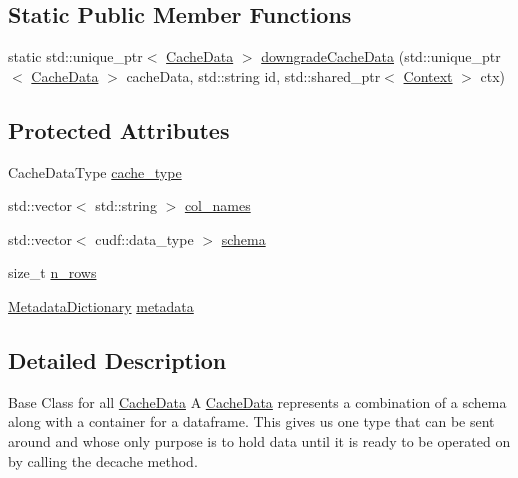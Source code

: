 \subsection*{Static Public Member Functions}
\begin{DoxyCompactItemize}
\item 
static std\+::unique\+\_\+ptr$<$ \hyperlink{classral_1_1cache_1_1CacheData}{Cache\+Data} $>$ \hyperlink{classral_1_1cache_1_1CacheData_af70878c08fae1935cd0a39999cabf6fb}{downgrade\+Cache\+Data} (std\+::unique\+\_\+ptr$<$ \hyperlink{classral_1_1cache_1_1CacheData}{Cache\+Data} $>$ cache\+Data, std\+::string id, std\+::shared\+\_\+ptr$<$ \hyperlink{classblazingdb_1_1manager_1_1Context}{Context} $>$ ctx)
\end{DoxyCompactItemize}
\subsection*{Protected Attributes}
\begin{DoxyCompactItemize}
\item 
Cache\+Data\+Type \hyperlink{classral_1_1cache_1_1CacheData_acf9d130e22baac61d4689c52e36b9c17}{cache\+\_\+type}
\item 
std\+::vector$<$ std\+::string $>$ \hyperlink{classral_1_1cache_1_1CacheData_a7a43a46a362c8fe93a7af81debbeca1b}{col\+\_\+names}
\item 
std\+::vector$<$ cudf\+::data\+\_\+type $>$ \hyperlink{classral_1_1cache_1_1CacheData_aec9a1b3c0fb78cfdb3bd5494bcee2d8f}{schema}
\item 
size\+\_\+t \hyperlink{classral_1_1cache_1_1CacheData_a4cdddfb8e552e0e3e91877ae80e5fc9e}{n\+\_\+rows}
\item 
\hyperlink{classral_1_1cache_1_1MetadataDictionary}{Metadata\+Dictionary} \hyperlink{classral_1_1cache_1_1CacheData_aaeb232ef3aa8c2a3d86e1169ed2e8152}{metadata}
\end{DoxyCompactItemize}


\subsection{Detailed Description}
Base Class for all \hyperlink{classral_1_1cache_1_1CacheData}{Cache\+Data} A \hyperlink{classral_1_1cache_1_1CacheData}{Cache\+Data} represents a combination of a schema along with a container for a dataframe. This gives us one type that can be sent around and whose only purpose is to hold data until it is ready to be operated on by calling the decache method. 

